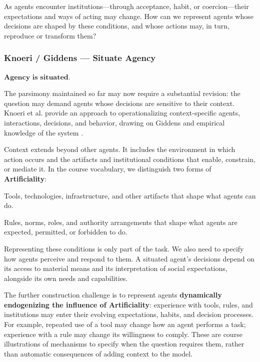 \documentclass[11pt,a4paper]{article}
\newenvironment{fitdisplay}{\par\medskip\noindent\begin{lrbox}{\displaybox}$\displaystyle}{%
$\end{lrbox}\makebox[\linewidth][c]{\ifdim\wd\displaybox>\linewidth\resizebox{\linewidth}{!}{\usebox{\displaybox}}\else\usebox{\displaybox}\fi}\par\medskip}
\begin{document}
As agents encounter institutions---through acceptance, habit, or coercion---their expectations and ways of acting may change. How can we represent agents whose decisions are shaped by these conditions, and whose actions may, in turn, reproduce or transform them?

\subsubsection{Knoeri / Giddens --- Situate Agency}

\begin{fitdisplay}
\boxed{\textbf{Agency is situated.}}
\end{fitdisplay}

The parsimony maintained so far may now require a substantial revision: the question may demand agents whose decisions are sensitive to their context. Knoeri et al. provide an approach to operationalizing context-specific agents, interactions, decisions, and behavior, drawing on Giddens and empirical knowledge of the system \cite{knoeri}.

Context extends beyond other agents. It includes the environment in which action occurs and the artifacts and institutional conditions that enable, constrain, or mediate it. In the course vocabulary, we distinguish two forms of \textbf{Artificiality}:

\begin{description}[style=nextline,leftmargin=0pt,itemsep=4pt]
\item[Material Artificiality] Tools, technologies, infrastructure, and other artifacts that shape what agents can do.
\item[Social Artificiality] Rules, norms, roles, and authority arrangements that shape what agents are expected, permitted, or forbidden to do.
\end{description}

Representing these conditions is only part of the task. We also need to specify how agents perceive and respond to them. A situated agent's decisions depend on its access to material means and its interpretation of social expectations, alongside its own needs and capabilities.

The further construction challenge is to represent agents \textbf{dynamically endogenizing the influence of Artificiality}: experience with tools, rules, and institutions may enter their evolving expectations, habits, and decision processes. For example, repeated use of a tool may change how an agent performs a task; experience with a rule may change its willingness to comply. These are course illustrations of mechanisms to specify when the question requires them, rather than automatic consequences of adding context to the model.
\end{document}
